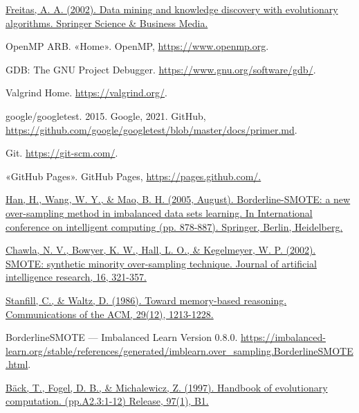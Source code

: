 \begin{thebibliography}{9}
	\href{https://link.springer.com/book/10.1007/978-3-662-04923-5}{Freitas, A. A. (2002). Data mining and knowledge discovery with evolutionary algorithms. Springer Science \& Business Media.}


	OpenMP ARB. «Home». OpenMP, \url{https://www.openmp.org}.


	GDB: The GNU Project Debugger. \url{https://www.gnu.org/software/gdb/}.


	Valgrind Home. \url{https://valgrind.org/}.


	google/googletest. 2015. Google, 2021. GitHub, \url{https://github.com/google/googletest/blob/master/docs/primer.md}.


	Git. \url{https://git-scm.com/}.


	«GitHub Pages». GitHub Pages, \url{https://pages.github.com/.}


	\href{https://link.springer.com/chapter/10.1007/11538059_91}{Han, H., Wang, W. Y., \& Mao, B. H. (2005, August). Borderline-SMOTE: a new over-sampling method in imbalanced data sets learning. In International conference on intelligent computing (pp. 878-887). Springer, Berlin, Heidelberg.}


	\href{https://www.jair.org/index.php/jair/article/view/10302}{Chawla, N. V., Bowyer, K. W., Hall, L. O., \& Kegelmeyer, W. P. (2002). SMOTE: synthetic minority over-sampling technique. Journal of artificial intelligence research, 16, 321-357.}


	\href{https://dl.acm.org/doi/pdf/10.1145/7902.7906}{Stanfill, C., \& Waltz, D. (1986). Toward memory-based reasoning. Communications of the ACM, 29(12), 1213-1228.}


	BorderlineSMOTE — Imbalanced Learn Version 0.8.0. \url{https://imbalanced-learn.org/stable/references/generated/imblearn.over_sampling.BorderlineSMOTE.html}.



	\href{https://www.researchgate.net/publication/216300863_A_history_of_evolutionary_computation}{Bäck, T., Fogel, D. B., \& Michalewicz, Z. (1997). Handbook of evolutionary computation. (pp.A2.3:1-12) Release, 97(1), B1.}


\end{thebibliography}
